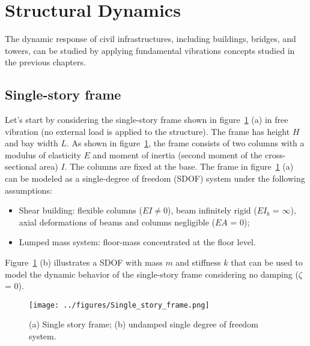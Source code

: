 \documentclass[12pt,letter]{article}
\begin{document}
	
	\setcounter{section}{7}	
	\setcounter{figure}{0}   
	\renewcommand\thefigure{\thesection.\arabic{figure}}
	\setcounter{equation}{0}   
	\renewcommand\theequation{\thesection.\arabic{equation}}	
	
	\section{Structural Dynamics}	

The dynamic response of civil infrastructures, including buildings, bridges, and towers, can be studied by applying fundamental vibrations concepts studied in the previous chapters. 
	
	\subsection{Single-story frame}

Let's start by considering the single-story frame shown in figure~\ref{fig:one_story_frame_example} (a) in free vibration (no external load is applied to the structure). The frame has height $H$ and bay width $L$. As shown in figure~\ref{fig:one_story_frame_example}, the frame consists of two columns with a modulus of elasticity $E$ and moment of inertia (second moment of the cross-sectional area) $I$. The columns are fixed at the base. The frame in figure~\ref{fig:one_story_frame_example} (a) can be modeled as a single-degree of freedom (SDOF) system under the following assumptions:

\begin{itemize}
	\item Shear building: flexible columns ($EI \neq 0$), beam infinitely rigid ($EI_b$ = $\infty$), axial deformations of beams and columns negligible ($EA$ = 0);
	\item Lumped mass system: floor-mass concentrated at the floor level.
\end{itemize}

Figure~\ref{fig:one_story_frame_example} (b) illustrates a SDOF with mass $m$ and stiffness $k$ that can be used to model the dynamic behavior of the single-story frame considering no damping ($\zeta$ = 0). 

\begin{figure}[H]
	\centering
	\texttt{[image: ../figures/Single\_story\_frame.png]}
	\caption{(a) Single story frame; (b) undamped single degree of freedom system.}
	\label{fig:one_story_frame_example}
\end{figure}
\end{document}
